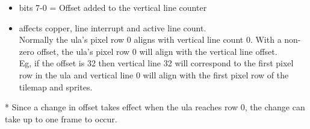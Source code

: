 \begin{itemize}
\item bits 7-0 = Offset added to the vertical line counter
\item[] affects copper, line interrupt and active line
  count.\\
  Normally the ula's pixel row 0 aligns with vertical line count 0.
  With a non-zero offset, the ula's pixel row 0 will align with the
  vertical line offset.\\
  Eg, if the offset is 32 then vertical line 32 will correspond to
  the first pixel row in the ula and vertical line 0 will align with
  the first pixel row of the tilemap and sprites.
\end{itemize}
* Since a change in offset takes effect when the ula reaches row 0,
the change can take up to one frame to occur.

